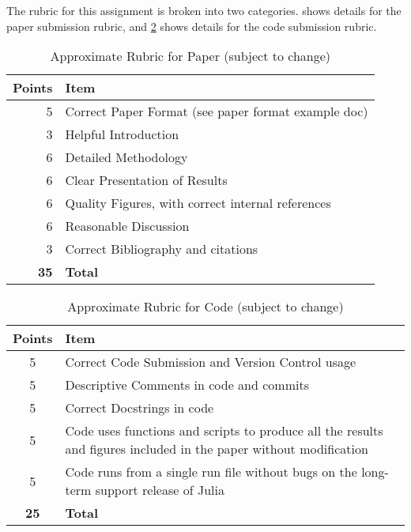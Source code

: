 \documentclass[12pt]{article}
\begin{document}
The rubric for this assignment is broken into two categories. 
 shows details for the paper submission rubric, and
\cref{tab:coderubric} shows details for the code submission rubric.

\begin{table}[h!]
	\caption{Approximate Rubric for Paper (subject to change)}
	\label{tab:paperrubric}
	\renewcommand{\arraystretch}{1.2}
	\vspace{1em}
	\begin{tabular}{r|p{5in}}
		\textbf{Points} & \textbf{Item} \\ 
		\hline
		5 & Correct Paper Format (see paper format example doc) \\
		3 & Helpful Introduction \\
		6 & Detailed Methodology \\
		6 & Clear Presentation of Results \\
		6 & Quality Figures, with correct internal references \\
		6 & Reasonable Discussion \\
		3 & Correct Bibliography and citations \\
		\textbf{35} & \textbf{Total}
	\end{tabular}
\end{table}

\begin{table}[h!]
	\caption{Approximate Rubric for Code (subject to change)}
	\label{tab:coderubric}
	\renewcommand{\arraystretch}{1.2}
	\vspace{1em}
	\begin{tabular}{c|p{5in}}
		\textbf{Points} & \textbf{Item} \\ 
		\hline
		5 & Correct Code Submission and Version Control usage\\
		5 & Descriptive Comments in code and commits \\
		5 & Correct Docstrings in code\\
		5 & Code uses functions and scripts to produce all the results and figures included in the paper without modification \\
		5 & Code runs from a single run file without bugs on the long-term support release of Julia\\
		\textbf{25} & \textbf{Total}
	\end{tabular}
\end{table}
\end{document}
